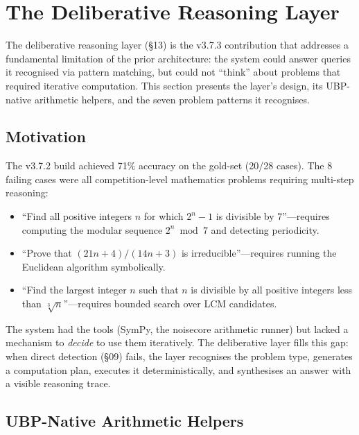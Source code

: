 \documentclass[11pt,a4paper]{article}
\begin{document}
\section{The Deliberative Reasoning Layer}
\label{sec:deliberative}

The deliberative reasoning layer (\S13) is the v3.7.3 contribution that addresses a fundamental limitation of the prior architecture: the system could answer queries it recognised via pattern matching, but could not ``think'' about problems that required iterative computation. This section presents the layer's design, its UBP-native arithmetic helpers, and the seven problem patterns it recognises.

\subsection{Motivation}

The v3.7.2 build achieved 71\% accuracy on the gold-set (20/28 cases). The 8 failing cases were all competition-level mathematics problems requiring multi-step reasoning:

\begin{itemize}
    \item ``Find all positive integers $n$ for which $2^n - 1$ is divisible by 7''---requires computing the modular sequence $2^n \bmod 7$ and detecting periodicity.
    \item ``Prove that $(21n+4)/(14n+3)$ is irreducible''---requires running the Euclidean algorithm symbolically.
    \item ``Find the largest integer $n$ such that $n$ is divisible by all positive integers less than $\sqrt[3]{n}$''---requires bounded search over LCM candidates.
\end{itemize}

The system had the tools (SymPy, the noisecore arithmetic runner) but lacked a mechanism to \emph{decide} to use them iteratively. The deliberative layer fills this gap: when direct detection (\S09) fails, the layer recognises the problem type, generates a computation plan, executes it deterministically, and synthesises an answer with a visible reasoning trace.

\subsection{UBP-Native Arithmetic Helpers}
\end{document}
